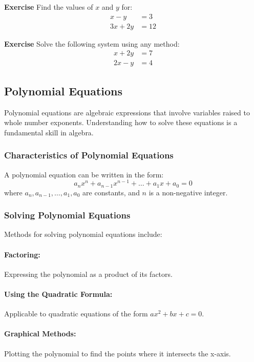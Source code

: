\documentclass[a4paper,12pt]{book}
\newenvironment{exercise}[1][]
  {\par\medskip\noindent\textbf{Exercise #1} \rmfamily}
  {\medskip}
\begin{document}
\begin{exercise}
Find the values of \( x \) and \( y \) for:
\begin{align*}
    x - y &= 3 \\
    3x + 2y &= 12
\end{align*}
\end{exercise}

\begin{exercise}
Solve the following system using any method:
\begin{align*}
    x + 2y &= 7 \\
    2x - y &= 4
\end{align*}
\end{exercise}


\subsection{Polynomial Equations}
\label{subsec:polynomial_equations}
Polynomial equations are algebraic expressions that involve variables raised to whole number exponents. Understanding how to solve these equations is a fundamental skill in algebra.

\subsubsection{Characteristics of Polynomial Equations}
A polynomial equation can be written in the form:
\[ a_nx^n + a_{n-1}x^{n-1} + \ldots + a_1x + a_0 = 0 \]
where \( a_n, a_{n-1}, \ldots, a_1, a_0 \) are constants, and \( n \) is a non-negative integer.

\subsubsection{Solving Polynomial Equations}
Methods for solving polynomial equations include:

\paragraph{Factoring:} Expressing the polynomial as a product of its factors.
\paragraph{Using the Quadratic Formula:} Applicable to quadratic equations of the form \( ax^2 + bx + c = 0 \).
\paragraph{Graphical Methods:} Plotting the polynomial to find the points where it intersects the x-axis.
\end{document}
